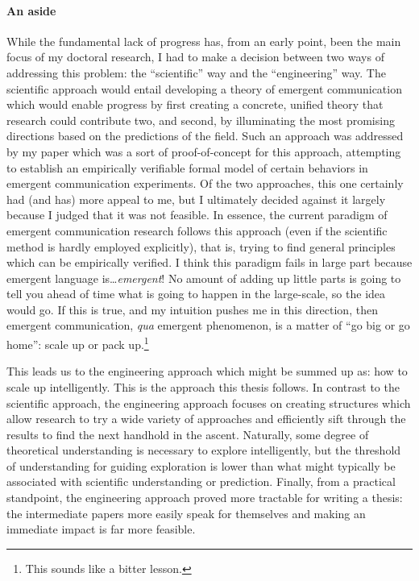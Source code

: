 \paragraph{An aside}
While the fundamental lack of progress has, from an early point, been the main focus of my doctoral research, I had to make a decision between two ways of addressing this problem: the ``scientific'' way and the ``engineering'' way.
The scientific approach would entail developing a theory of emergent communication which would enable progress by first creating a concrete, unified theory that research could contribute two, and second, by illuminating the most promising directions based on the predictions of the field.
Such an approach was addressed by my paper   which was a sort of proof-of-concept for this approach, attempting to establish an empirically verifiable formal model of certain behaviors in emergent communication experiments.
Of the two approaches, this one certainly had (and has) more appeal to me, but I ultimately decided against it largely because I judged that it was not feasible.
In essence, the current paradigm of emergent communication research follows this approach (even if the scientific method is hardly employed explicitly), that is, trying to find general principles which can be empirically verified.
I think this paradigm fails in large part because emergent language is\dots\emph{emergent}!
No amount of adding up little parts is going to tell you ahead of time what is going to happen in the large-scale, so the idea would go.
If this is true, and my intuition pushes me in this direction, then emergent communication, \emph{qua} emergent phenomenon, is a matter of ``go big or go home'': scale up or pack up.\footnote{This sounds like a bitter lesson. }

This leads us to the engineering approach which might be summed up as: how to scale up intelligently.
This is the approach this thesis follows.
In contrast to the scientific approach, the engineering approach focuses on creating structures which allow research to try a wide variety of approaches and efficiently sift through the results to find the next handhold in the ascent.
Naturally, some degree of theoretical understanding is necessary to explore intelligently, but the threshold of understanding for guiding exploration is lower than what might typically be associated with scientific understanding or prediction.
Finally, from a practical standpoint, the engineering approach proved more tractable for writing a thesis: the intermediate papers more easily speak for themselves and making an immediate impact is far more feasible.


